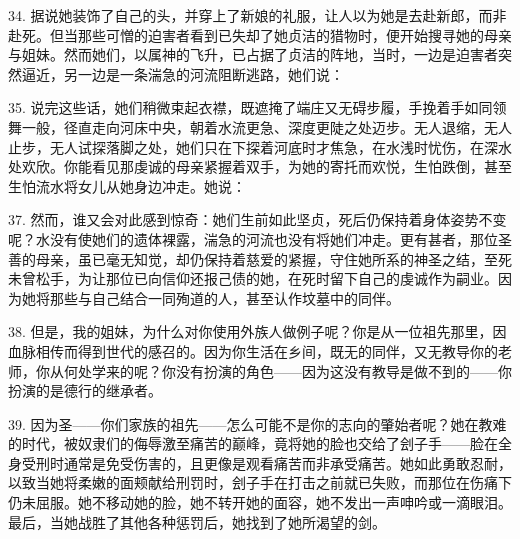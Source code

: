 34. 据说她装饰了自己的头，并穿上了新娘的礼服，让人以为她是去赴新郎，而非赴死。但当那些可憎的迫害者看到已失却了她贞洁的猎物时，便开始搜寻她的母亲与姐妹。然而她们，以属神的飞升，已占据了贞洁的阵地，当时，一边是迫害者突然逼近，另一边是一条湍急的河流阻断逃路，她们说：\par

35. 说完这些话，她们稍微束起衣襟，既遮掩了端庄又无碍步履，手挽着手如同领舞一般，径直走向河床中央，朝着水流更急、深度更陡之处迈步。无人退缩，无人止步，无人试探落脚之处，她们只在下探着河底时才焦急，在水浅时忧伤，在深水处欢欣。你能看见那虔诚的母亲紧握着双手，为她的寄托而欢悦，生怕跌倒，甚至生怕流水将女儿从她身边冲走。她说：\par

37. 然而，谁又会对此感到惊奇：她们生前如此坚贞，死后仍保持着身体姿势不变呢？水没有使她们的遗体裸露，湍急的河流也没有将她们冲走。更有甚者，那位圣善的母亲，虽已毫无知觉，却仍保持着慈爱的紧握，守住她所系的神圣之结，至死未曾松手，为让那位已向信仰还报己债的她，在死时留下自己的虔诚作为嗣业。因为她将那些与自己结合一同殉道的人，甚至认作坟墓中的同伴。\par

38. 但是，我的姐妹，为什么对你使用外族人做例子呢？你是从一位祖先那里，因血脉相传而得到世代的感召的。因为你生活在乡间，既无的同伴，又无教导你的老师，你从何处学来的呢？你没有扮演的角色——因为这没有教导是做不到的——你扮演的是德行的继承者。\par

39. 因为圣——你们家族的祖先——怎么可能不是你的志向的肇始者呢？她在教难的时代，被奴隶们的侮辱激至痛苦的巅峰，竟将她的脸也交给了刽子手——脸在全身受刑时通常是免受伤害的，且更像是观看痛苦而非承受痛苦。她如此勇敢忍耐，以致当她将柔嫩的面颊献给刑罚时，刽子手在打击之前就已失败，而那位在伤痛下仍未屈服。她不移动她的脸，她不转开她的面容，她不发出一声呻吟或一滴眼泪。最后，当她战胜了其他各种惩罚后，她找到了她所渴望的剑。\par

